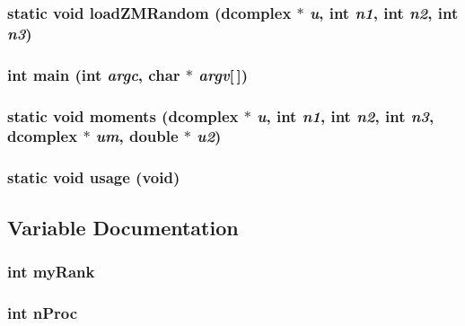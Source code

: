 \subsubsection{\setlength{\rightskip}{0pt plus 5cm}static void load\-ZMRandom ({\bf dcomplex} $\ast$ {\em u}, int {\em n1}, int {\em n2}, int {\em n3})\hspace{0.3cm}{\tt  [static]}}\label{benchfft_8c_0dceeb3a6fe5ee2b076c4b2244f19fde}


\subsubsection{\setlength{\rightskip}{0pt plus 5cm}int main (int {\em argc}, char $\ast$ {\em argv}[$\,$])}\label{benchfft_8c_0ddf1224851353fc92bfbff6f499fa97}


\subsubsection{\setlength{\rightskip}{0pt plus 5cm}static void moments ({\bf dcomplex} $\ast$ {\em u}, int {\em n1}, int {\em n2}, int {\em n3}, {\bf dcomplex} $\ast$ {\em um}, double $\ast$ {\em u2})\hspace{0.3cm}{\tt  [static]}}\label{benchfft_8c_94f81e81aa1d30fc701e6233a1b0e556}


\subsubsection{\setlength{\rightskip}{0pt plus 5cm}static void usage (void)\hspace{0.3cm}{\tt  [static]}}\label{benchfft_8c_d96d407a911fbb914fa8e4cfbf2faf0f}




\subsection{Variable Documentation}
\subsubsection{\setlength{\rightskip}{0pt plus 5cm}int {\bf my\-Rank}}\label{benchfft_8c_59583c2c54e34ab626dfbd1f075c4d1f}


\subsubsection{\setlength{\rightskip}{0pt plus 5cm}int {\bf n\-Proc}}\label{benchfft_8c_19e98b29873d39c5b4a1ce74eac4bba6}


